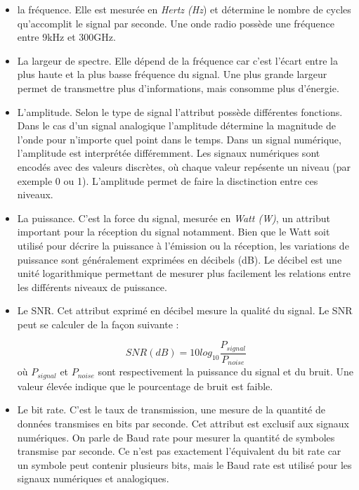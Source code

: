 \vspace{0.1cm}

\begin{itemize}



\item la fréquence. Elle est mesurée en \textit{Hertz (Hz}) et détermine le nombre de cycles qu'accomplit le signal par seconde. Une onde radio possède une fréquence entre 9kHz et 300GHz.

\item La largeur de spectre. Elle dépend de la fréquence car c'est l'écart entre la plus haute et la plus basse fréquence du signal. Une plus grande largeur permet de transmettre plus d'informations, mais consomme plus d'énergie.

\item L'amplitude. Selon le type de signal l'attribut possède différentes fonctions. Dans le cas d'un signal analogique l'amplitude détermine la magnitude de l'onde pour n'importe quel point dans le temps. Dans un signal numérique, l'amplitude est interprétée différemment. Les signaux numériques sont encodés avec des valeurs discrètes, où chaque valeur repésente un niveau (par exemple 0 ou 1). L'amplitude permet de faire la disctinction entre ces niveaux.

\item La puissance. C'est la force du signal, mesurée en \textit{Watt (W)}, un attribut important pour la réception du signal notamment. Bien que le Watt soit utilisé pour décrire la puissance à l'émission ou la réception, les variations de puissance sont généralement exprimées en décibels (dB). Le décibel est une unité logarithmique permettant de mesurer plus facilement les relations entre les différents niveaux de puissance.

\item Le \ac{SNR}. Cet attribut exprimé en décibel mesure la qualité du signal. Le SNR peut se calculer de la façon suivante : 

\begin{equation}\label{eq0}
SNR(dB) = 10log_{10} \frac{P_{signal}}{P_{noise}}
\end{equation}
où $P_{signal}$ et $P_{noise}$ sont respectivement la puissance du signal et du bruit. Une valeur élevée indique que le pourcentage de bruit est faible. 


\item Le bit rate. C'est le taux de transmission, une mesure de la quantité de données transmises en bits par seconde. Cet attribut est exclusif aux signaux numériques. On parle de Baud rate pour mesurer la quantité de symboles transmise par seconde. Ce n'est pas exactement l'équivalent du bit rate car un symbole peut contenir plusieurs bits, mais le Baud rate est utilisé pour les signaux numériques et analogiques.

\end{itemize}


